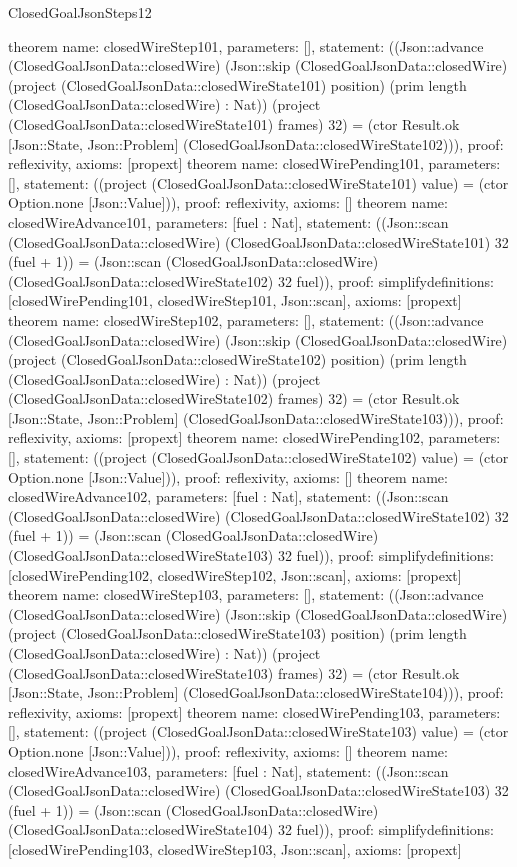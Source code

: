\begin{lexlean}{ClosedGoalJsonSteps12}
\begin{semanticmodule}
{}
theorem{
 name: closedWireStep101, parameters: [],
 statement: ((Json::advance (ClosedGoalJsonData::closedWire) (Json::skip (ClosedGoalJsonData::closedWire) (project (ClosedGoalJsonData::closedWireState101) position) (prim length (ClosedGoalJsonData::closedWire) : Nat)) (project (ClosedGoalJsonData::closedWireState101) frames) 32) = (ctor Result.ok [Json::State, Json::Problem] (ClosedGoalJsonData::closedWireState102))), proof: reflexivity{}, axioms: [propext]
}
theorem{
 name: closedWirePending101, parameters: [],
 statement: ((project (ClosedGoalJsonData::closedWireState101) value) = (ctor Option.none [Json::Value])), proof: reflexivity{}, axioms: []
}
theorem{
 name: closedWireAdvance101, parameters: [fuel : Nat],
 statement: ((Json::scan (ClosedGoalJsonData::closedWire) (ClosedGoalJsonData::closedWireState101) 32 (fuel + 1)) = (Json::scan (ClosedGoalJsonData::closedWire) (ClosedGoalJsonData::closedWireState102) 32 fuel)), proof: simplify{definitions: [closedWirePending101, closedWireStep101, Json::scan]}, axioms: [propext]
}
theorem{
 name: closedWireStep102, parameters: [],
 statement: ((Json::advance (ClosedGoalJsonData::closedWire) (Json::skip (ClosedGoalJsonData::closedWire) (project (ClosedGoalJsonData::closedWireState102) position) (prim length (ClosedGoalJsonData::closedWire) : Nat)) (project (ClosedGoalJsonData::closedWireState102) frames) 32) = (ctor Result.ok [Json::State, Json::Problem] (ClosedGoalJsonData::closedWireState103))), proof: reflexivity{}, axioms: [propext]
}
theorem{
 name: closedWirePending102, parameters: [],
 statement: ((project (ClosedGoalJsonData::closedWireState102) value) = (ctor Option.none [Json::Value])), proof: reflexivity{}, axioms: []
}
theorem{
 name: closedWireAdvance102, parameters: [fuel : Nat],
 statement: ((Json::scan (ClosedGoalJsonData::closedWire) (ClosedGoalJsonData::closedWireState102) 32 (fuel + 1)) = (Json::scan (ClosedGoalJsonData::closedWire) (ClosedGoalJsonData::closedWireState103) 32 fuel)), proof: simplify{definitions: [closedWirePending102, closedWireStep102, Json::scan]}, axioms: [propext]
}
theorem{
 name: closedWireStep103, parameters: [],
 statement: ((Json::advance (ClosedGoalJsonData::closedWire) (Json::skip (ClosedGoalJsonData::closedWire) (project (ClosedGoalJsonData::closedWireState103) position) (prim length (ClosedGoalJsonData::closedWire) : Nat)) (project (ClosedGoalJsonData::closedWireState103) frames) 32) = (ctor Result.ok [Json::State, Json::Problem] (ClosedGoalJsonData::closedWireState104))), proof: reflexivity{}, axioms: [propext]
}
theorem{
 name: closedWirePending103, parameters: [],
 statement: ((project (ClosedGoalJsonData::closedWireState103) value) = (ctor Option.none [Json::Value])), proof: reflexivity{}, axioms: []
}
theorem{
 name: closedWireAdvance103, parameters: [fuel : Nat],
 statement: ((Json::scan (ClosedGoalJsonData::closedWire) (ClosedGoalJsonData::closedWireState103) 32 (fuel + 1)) = (Json::scan (ClosedGoalJsonData::closedWire) (ClosedGoalJsonData::closedWireState104) 32 fuel)), proof: simplify{definitions: [closedWirePending103, closedWireStep103, Json::scan]}, axioms: [propext]
}
\end{semanticmodule}
\end{lexlean}
